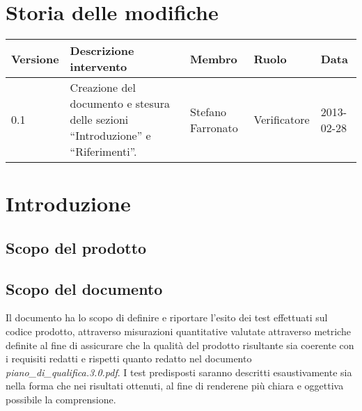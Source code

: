 





\section*{Storia delle modifiche}
\begin{center}
\begin{longtable}{lp{}lll}
\toprule
Versione & Descrizione intervento & Membro & Ruolo & Data\\
\midrule %
0.1 & Creazione del documento e stesura delle sezioni ``Introduzione'' e ``Riferimenti''. & Stefano Farronato & Verificatore & 2013-02-28\\
\bottomrule
\end{longtable}
\end{center}
\newpage



\setcounter{page}{1}
\pagestyle{normal}

\newpage

\section{Introduzione}
\subsection{Scopo del prodotto}
\purpose

\subsection{Scopo del documento}
Il documento ha lo scopo di definire e riportare l'esito dei test effettuati sul codice prodotto, attraverso misurazioni quantitative valutate attraverso metriche definite al fine di assicurare che la qualità del prodotto risultante sia coerente con i requisiti redatti e rispetti quanto redatto nel documento \textit{piano\_di\_qualifica.3.0.pdf}.
I test predisposti saranno descritti esaustivamente sia nella forma che nei risultati ottenuti, al fine di renderene più chiara e oggettiva possibile la comprensione.

